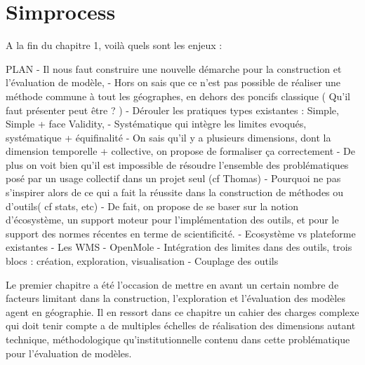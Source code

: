 
\graphicspath{{Figure2/}}

\chapter{Simprocess}

\startcontents[chapters]
\Mprintcontents

A la fin du chapitre 1, voilà quels sont les enjeux :


PLAN
- Il nous faut construire une nouvelle démarche pour la construction et l'évaluation de modèle,
- Hors on sais que ce n'est pas possible de réaliser une méthode commune à tout les géographes, en dehors des poncifs classique ( Qu'il faut présenter peut être ? )
	- Dérouler les pratiques types existantes : Simple, Simple + face Validity,
	- Systématique qui intègre les limites evoqués, systématique + équifinalité 
- On sais qu'il y a plusieurs dimensions, dont la dimension temporelle + collective, on propose de formaliser ça correctement
- De plus on voit bien qu'il est impossible de résoudre l'ensemble des problématiques posé par un usage collectif dans un projet seul (cf Thomas)
- Pourquoi ne pas s'inspirer alors de ce qui a fait la réussite dans la construction de méthodes ou d'outils( cf stats, etc)
- De fait, on propose de se baser sur la notion d'écosystème, un support moteur pour l'implémentation des outils, et pour le support des normes récentes en terme de scientificité.
- Ecosystème vs plateforme existantes
- Les WMS
- OpenMole
- Intégration des limites dans des outils, trois blocs : création, exploration, visualisation
- Couplage des outils

Le premier chapitre a été l’occasion de mettre en avant un certain nombre de facteurs limitant dans la construction, l'exploration et l'évaluation des modèles agent en géographie. Il en ressort dans ce chapitre un cahier des charges complexe qui doit tenir compte a de multiples échelles de réalisation des dimensions autant technique, méthodologique qu’institutionnelle contenu dans cette problématique pour l'évaluation de modèles.


